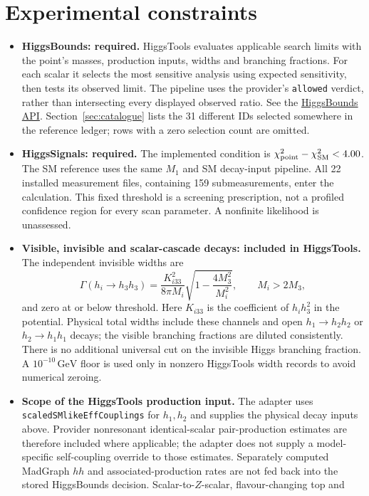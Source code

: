 \documentclass[11pt,a4paper]{article}
\newcommand{\code}[1]{\ifmmode\mbox{\ttfamily\detokenize{#1}}\else\nolinkurl{#1}\fi}
\newcommand{\GeV}{\,\mathrm{GeV}}
\begin{document}
\section{Experimental constraints}
\begin{itemize}
\item \textbf{HiggsBounds: required.} HiggsTools evaluates applicable
search limits with the point's masses, production inputs, widths and branching
fractions. For each scalar it selects the most sensitive analysis using
expected sensitivity, then tests its observed limit. The pipeline uses the
provider's \code{allowed} verdict, rather than intersecting every displayed
observed ratio. See the \href{https://higgsbounds.gitlab.io/higgstools/HiggsBoundsAPI.html}{HiggsBounds API}.
Section~\ref{sec:catalogue} lists the 31 different IDs selected somewhere in
the reference ledger; rows with a zero selection count are omitted.
\item \textbf{HiggsSignals: required.} The implemented condition is
$\chi^2_{\rm point}-\chi^2_{\rm SM}<4.00$. The SM reference uses the same
$M_1$ and SM decay-input pipeline. All 22 installed measurement files,
containing 159 submeasurements, enter the calculation. This fixed threshold
is a screening prescription, not a profiled confidence region for every
scan parameter. A nonfinite likelihood is unassessed.
\item \textbf{Visible, invisible and scalar-cascade decays: included in
HiggsTools.} The independent invisible widths are
\[
 \Gamma(h_i\to h_3h_3)=\frac{K_{i33}^2}{8\pi M_i}
 \sqrt{1-\frac{4M_3^2}{M_i^2}},\qquad M_i>2M_3,
\]
and zero at or below threshold. Here $K_{i33}$ is the coefficient of
$h_i h_3^2$ in the potential. Physical total widths include these channels
and open $h_1\to h_2h_2$ or $h_2\to h_1h_1$ decays; the visible branching
fractions are diluted consistently. There is no additional universal cut
on the invisible Higgs branching fraction. A $10^{-10}\GeV$ floor is used
only in nonzero HiggsTools width records to avoid numerical zeroing.
\item \textbf{Scope of the HiggsTools production input.} The adapter uses
\code{scaledSMlikeEffCouplings} for $h_1,h_2$ and supplies the physical decay
inputs above. Provider nonresonant identical-scalar pair-production estimates
are therefore included where applicable; the adapter does not supply a
model-specific self-coupling override to those estimates. Separately computed
MadGraph $hh$ and associated-production rates are not fed back into the
stored HiggsBounds decision. Scalar-to-$Z$-scalar, flavour-changing top and

\end{itemize}
\end{document}
